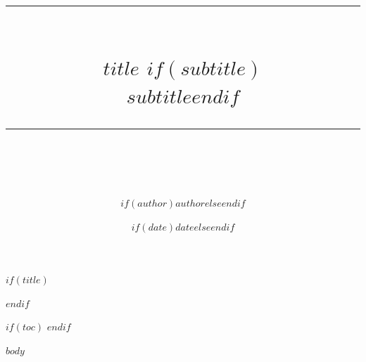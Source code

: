 \documentclass[a4paper,11pt]{article}
\title{
  {\color{headerbg}\rule{\linewidth}{2.5pt}}\\[6pt]
  {\LARGE\bfseries\color{headerbg} $title$}%
  $if(subtitle)$\\[4pt]{\large\color{header2bg} $subtitle$}$endif$\\[4pt]
  {\color{headerbg}\rule{\linewidth}{1pt}}\\[-8pt]
  \vspace{0pt}
}
\author{$if(author)$$author$$else$$endif$}
\date{$if(date)$$date$$else$$endif$}
\begin{document}
$if(title)$
\maketitle
\thispagestyle{fancy}
$endif$

$if(toc)$
{\hypersetup{linkcolor=headerbg}
\tableofcontents}
\newpage
$endif$

$body$
\end{document}
